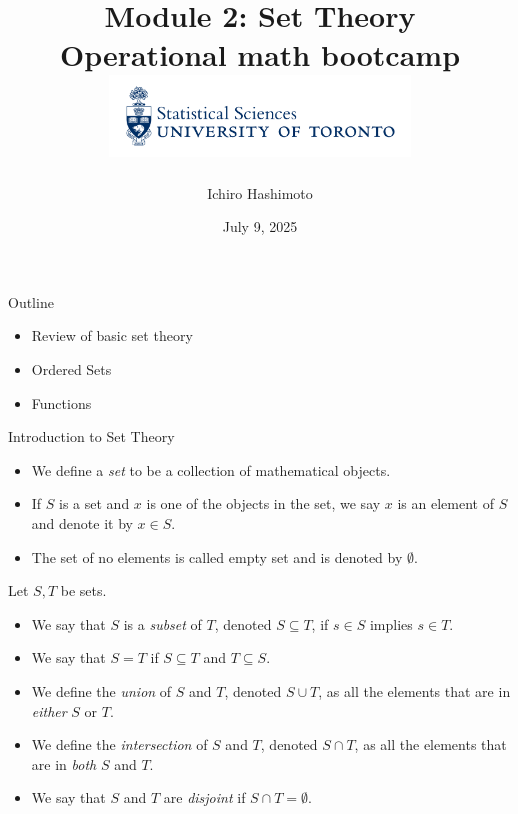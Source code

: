 \documentclass [aspectratio=169, handout]{beamer}
\title[]{Module 2: Set Theory \\ {\large Operational math bootcamp}\\ \includegraphics[width=8cm]{dept_logo.png}\vspace{-1em}}
\author[]{Ichiro Hashimoto}
\institute[]{University of Toronto}
\date{July 9, 2025}
\begin{document}
{
\begin{frame}
    \titlepage
\end{frame}
}

\begin{frame}{Outline}
    \begin{itemize}
    \setlength \itemsep{1em}
    	\item Review of basic set theory
	\item Ordered Sets
        \item Functions
    \end{itemize}
\end{frame}

\begin{frame}{Introduction to Set Theory}
\begin{itemize}
  \setlength\itemsep{1em}
\item We define a \emph{set} to be a collection of mathematical objects.
\item  If $S$ is a set and $x$ is one of the objects in the set, we say $x$ is an element of $S$ and denote it by $x\in S$.
\item The set of no elements is called empty set and is denoted by $\emptyset$.
\end{itemize}
\end{frame}

\begin{frame}
\begin{definition}
Let $S, T$ be sets. 
\begin{itemize}
    \item We say that $S$ is a \emph{subset} of $T$, denoted $S\subseteq T$, if $s\in S$ implies $s\in T$. 
    \item We say that $S=T$ if $S\subseteq T$ and $T\subseteq S$.
    \item We define the \emph{union} of $S$ and $T$, denoted $S \cup T$, as all the elements that are in \emph{either} $S$ or $T$.
    \item We define the \emph{intersection} of $S$ and $T$, denoted $S \cap T$, as all the elements that are in \emph{both} $S$ and $T$.
    \item We say that $S$ and $T$ are \emph{disjoint} if $S \cap T = \emptyset$.
\end{itemize}
\end{definition}
\end{frame}
\end{document}
